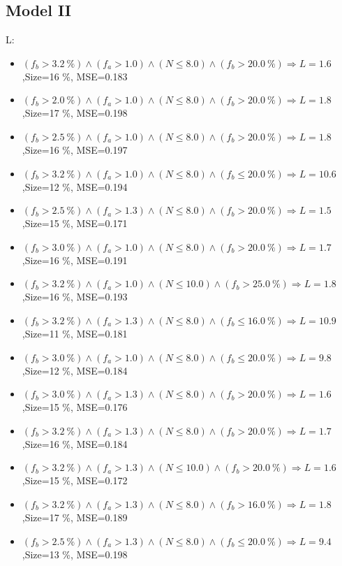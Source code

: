 \documentclass[numbered]{CSL}
\begin{document}
\subsection{Model II}
L:
\begin{itemize}
\item $(f_b > 3.2~\%) \land (f_a > 1.0) \land (N \leq 8.0) \land (f_b > 20.0~\%) \Rightarrow L = 1.6$,\hfill Size=16 \%, MSE=0.183
\item $(f_b > 2.0~\%) \land (f_a > 1.0) \land (N \leq 8.0) \land (f_b > 20.0~\%) \Rightarrow L = 1.8$,\hfill Size=17 \%, MSE=0.198
\item $(f_b > 2.5~\%) \land (f_a > 1.0) \land (N \leq 8.0) \land (f_b > 20.0~\%) \Rightarrow L = 1.8$,\hfill Size=16 \%, MSE=0.197
\item $(f_b > 3.2~\%) \land (f_a > 1.0) \land (N \leq 8.0) \land (f_b \leq 20.0~\%) \Rightarrow L = 10.6$,\hfill Size=12 \%, MSE=0.194
\item $(f_b > 2.5~\%) \land (f_a > 1.3) \land (N \leq 8.0) \land (f_b > 20.0~\%) \Rightarrow L = 1.5$,\hfill Size=15 \%, MSE=0.171
\item $(f_b > 3.0~\%) \land (f_a > 1.0) \land (N \leq 8.0) \land (f_b > 20.0~\%) \Rightarrow L = 1.7$,\hfill Size=16 \%, MSE=0.191
\item $(f_b > 3.2~\%) \land (f_a > 1.0) \land (N \leq 10.0) \land (f_b > 25.0~\%) \Rightarrow L = 1.8$,\hfill Size=16 \%, MSE=0.193
\item $(f_b > 3.2~\%) \land (f_a > 1.3) \land (N \leq 8.0) \land (f_b \leq 16.0~\%) \Rightarrow L = 10.9$,\hfill Size=11 \%, MSE=0.181
\item $(f_b > 3.0~\%) \land (f_a > 1.0) \land (N \leq 8.0) \land (f_b \leq 20.0~\%) \Rightarrow L = 9.8$,\hfill Size=12 \%, MSE=0.184
\item $(f_b > 3.0~\%) \land (f_a > 1.3) \land (N \leq 8.0) \land (f_b > 20.0~\%) \Rightarrow L = 1.6$,\hfill Size=15 \%, MSE=0.176
\item $(f_b > 3.2~\%) \land (f_a > 1.3) \land (N \leq 8.0) \land (f_b > 20.0~\%) \Rightarrow L = 1.7$,\hfill Size=16 \%, MSE=0.184
\item $(f_b > 3.2~\%) \land (f_a > 1.3) \land (N \leq 10.0) \land (f_b > 20.0~\%) \Rightarrow L = 1.6$,\hfill Size=15 \%, MSE=0.172
\item $(f_b > 3.2~\%) \land (f_a > 1.3) \land (N \leq 8.0) \land (f_b > 16.0~\%) \Rightarrow L = 1.8$,\hfill Size=17 \%, MSE=0.189
\item $(f_b > 2.5~\%) \land (f_a > 1.3) \land (N \leq 8.0) \land (f_b \leq 20.0~\%) \Rightarrow L = 9.4$,\hfill Size=13 \%, MSE=0.198

\end{itemize}
\end{document}
